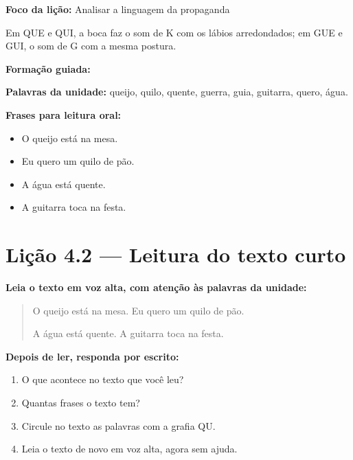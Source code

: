 \textbf{Foco da lição:} Analisar a linguagem da propaganda


\begin{boquinha}
Em QUE e QUI, a boca faz o som de K com os lábios arredondados; em GUE e GUI, o som de G com a mesma postura.
\end{boquinha}

\noindent\textbf{Formação guiada:}

\begin{center}
\end{center}

\noindent\textbf{Palavras da unidade:} queijo, quilo, quente, guerra, guia, guitarra, quero, água.

\noindent\textbf{Frases para leitura oral:}
\begin{itemize}[leftmargin=1.6em]
  \item O queijo está na mesa.
  \item Eu quero um quilo de pão.
  \item A água está quente.
  \item A guitarra toca na festa.
\end{itemize}

\section{Lição 4.2 --- Leitura do texto curto}

\noindent\textbf{Leia o texto em voz alta, com atenção às palavras da unidade:}


\begin{quote}
O queijo está na mesa. Eu quero um quilo de pão.

A água está quente. A guitarra toca na festa.
\end{quote}

\textbf{Depois de ler, responda por escrito:}
\begin{enumerate}

  \item O que acontece no texto que você leu?
  \begin{center}
  \underline{\hspace{12cm}}
  \end{center}

  \item Quantas frases o texto tem?
  \begin{center}
  \underline{\hspace{12cm}}
  \end{center}

  \item Circule no texto as palavras com a grafia QU.

  \item Leia o texto de novo em voz alta, agora sem ajuda.

\end{enumerate}

